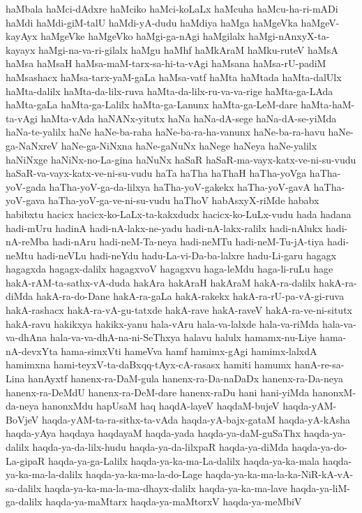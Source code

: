 {haMbala
haMci-dAdxre
haMciko
haMci-koLaLx
haMcuha
haMcu-ha-ri-mADi
haMdi
haMdi-giM-talU
haMdi-yA-dudu
haMdiya
haMga
haMgeVka
haMgeV-kayAyx
haMgeVke
haMgeVko
haMgi-ga-nAgi
haMgilalx
haMgi-nAnxyX-ta-kayayx
haMgi-na-va-ri-gilalx
haMgu
haMhf
haMkAraM
haMku-ruteV
haMsA
haMsa
haMsaH
haMsa-maM-tarx-sa-hi-ta-vAgi
haMsana
haMsa-rU-padiM
haMsashacx
haMsa-tarx-yaM-gaLa
haMsa-vatf
haMta
haMtada
haMta-dalUlx
haMta-dalilx
haMta-da-lilx-ruva
haMta-da-lilx-ru-va-va-rige
haMta-ga-LAda
haMta-gaLa
haMta-ga-Lalilx
haMta-ga-Lanunx
haMta-ga-LeM-dare
haMta-haM-ta-vAgi
haMta-vAda
haNANx-yitutx
haNa
haNa-dA-sege
haNa-dA-se-yiMda
haNa-te-yalilx
haNe
haNe-ba-raha
haNe-ba-ra-ha-vanunx
haNe-ba-ra-havu
haNe-ga-NaNxreV
haNe-ga-NiNxna
haNe-gaNuNx
haNege
haNeya
haNe-yalilx
haNiNxge
haNiNx-no-La-gina
haNuNx
haSaR
haSaR-ma-vayx-katx-ve-ni-su-vudu
haSaR-va-vayx-katx-ve-ni-su-vudu
haTa
haTha
haThaH
haTha-yoVga
haTha-yoV-gada
haTha-yoV-ga-da-lilxya
haTha-yoV-gakekx
haTha-yoV-gavA
haTha-yoV-gava
haTha-yoV-ga-ve-ni-su-vudu
haThoV
habAsxyX-riMde
hababx
habibxtu
hacicx
hacicx-ko-LaLx-ta-kakxdudx
hacicx-ko-LuLx-vudu
hada
hadana
hadi-mUru
hadinA
hadi-nA-lakx-ne-yadu
hadi-nA-lakx-ralilx
hadi-nAlukx
hadi-nA-reMba
hadi-nAru
hadi-neM-Ta-neya
hadi-neMTu
hadi-neM-Tu-jA-tiya
hadi-neMtu
hadi-neVLu
hadi-neYdu
hadu-La-vi-Da-ba-lalxre
hadu-Li-garu
hagagx
hagagxda
hagagx-dalilx
hagagxvoV
hagagxvu
haga-leMdu
haga-li-ruLu
hage
hakA-rAM-ta-sathx-vA-duda
hakAra
hakAraH
hakAraM
hakA-ra-dalilx
hakA-ra-diMda
hakA-ra-do-Dane
hakA-ra-gaLa
hakA-rakekx
hakA-ra-rU-pa-vA-gi-ruva
hakA-rashacx
hakA-ra-vA-gu-tatxde
hakA-rave
hakA-raveV
hakA-ra-ve-ni-situtx
hakA-ravu
hakikxya
hakikx-yanu
hala-vAru
hala-va-lalxde
hala-va-riMda
hala-va-va-dhAna
hala-va-va-dhA-na-ni-SeThxya
halavu
halulx
hamamx-nu-Liye
hama-nA-devxYta
hama-simxVti
hameVva
hamf
hamimx-gAgi
hamimx-lalxdA
hamimxna
hami-teyxV-ta-daBxqq-tAyx-cA-rasasx
hamiti
hamumx
hanA-re-sa-Lina
hanAyxtf
hanenx-ra-DaM-gula
hanenx-ra-Da-naDaDx
hanenx-ra-Da-neya
hanenx-ra-DeMdU
hanenx-ra-DeM-dare
hanenx-raDu
hani
hani-yiMda
hanonxM-da-neya
hanonxMdu
hapUsaM
haq
haqdA-layeV
haqdaM-bujeV
haqda-yAM-BoVjeV
haqda-yAM-ta-ra-sithx-ta-vAda
haqda-yA-bajx-gataM
haqda-yA-kAsha
haqda-yAya
haqdaya
haqdayaM
haqda-yada
haqda-ya-daM-guSaThx
haqda-ya-dalilx
haqda-ya-da-lilx-hudu
haqda-ya-da-lilxpaR
haqda-ya-diMda
haqda-ya-do-La-gipaR
haqda-ya-ga-Lalilx
haqda-ya-ka-ma-La-dalilx
haqda-ya-ka-mala
haqda-ya-ka-ma-la-dalilx
haqda-ya-ka-ma-la-do-Lage
haqda-ya-ka-ma-la-ka-NiR-kA-vA-sa-dalilx
haqda-ya-ka-ma-la-ma-dhayx-dalilx
haqda-ya-ka-ma-lave
haqda-ya-liM-ga-dalilx
haqda-ya-maMtarx
haqda-ya-maMtorxV
haqda-ya-meMbiV
}
